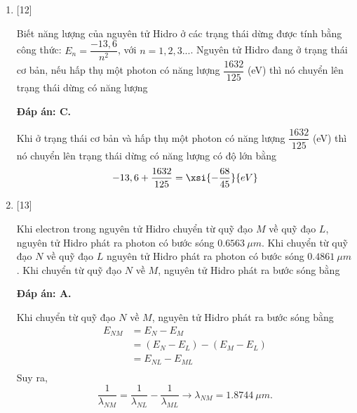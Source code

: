 \begin{enumerate}[label=\bfseries Câu \arabic*:]
	\item {} [12]
	\cauhoi
	{Biết năng lượng của nguyên tử Hidro ở các trạng thái dừng được tính bằng công thức: $ E_{n} = \dfrac{-13,6}{n^{2}} $, với $ n = 1,2,3... $. Nguyên tử Hidro đang ở trạng thái cơ bản, nếu hấp thụ một photon có năng lượng $ \dfrac{1632}{125} $ (eV) thì nó chuyển lên trạng thái dừng có năng lượng 
	}
	
	\loigiai
	{		\textbf{Đáp án: C.}
		
		Khi ở trạng thái cơ bản và hấp thụ một photon có năng lượng $ \dfrac{1632}{125} $ (eV) thì nó chuyển lên trạng thái dừng có năng lượng có độ lớn bằng
		\begin{equation*}
			-13,6 + \dfrac{1632}{125} = \xsi{-\dfrac{68}{45}}{eV}
		\end{equation*}
	}
	
	\item {} [13]
	\cauhoi
	{Khi electron trong nguyên tử Hidro chuyển từ quỹ đạo $ M $ về quỹ đạo $ L $, nguyên tử Hidro phát ra photon có bước sóng $ \SI{0,6563}{\mu m} $. Khi chuyển từ quỹ đạo $ N $ về quỹ đạo $ L $ nguyên tử Hidro phát ra photon có bước sóng $ \SI{0,4861}{\mu m} $. Khi chuyển từ quỹ đạo $ N $ về $ M $, nguyên tử Hidro phát ra bước sóng bằng
	}
	
	\loigiai
	{		\textbf{Đáp án: A.}
		
		Khi chuyển từ quỹ đạo $ N $ về $ M $, nguyên tử Hidro phát ra bước sóng bằng
		\begin{align*}
			E_{NM} &= E_{N} - E_{M} \\
			&= \left( E_{N} - E_{L} \right) - \left( E_{M} - E_{L} \right) \\
			&= E_{NL} - E_{ML} \\
		\end{align*}
		Suy ra,
		\begin{equation*}
			\dfrac{1}{\lambda_{NM}} = \dfrac{1}{\lambda_{NL}} - \dfrac{1}{\lambda_{ML}} \rightarrow \lambda_{NM} = \SI{1,8744}{\mu m}.  
		\end{equation*}
	}
	

\end{enumerate}
